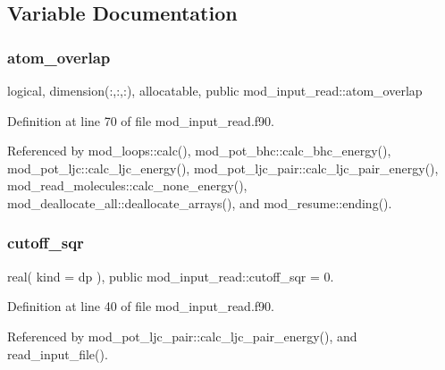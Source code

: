 \subsection{Variable Documentation}
\mbox{\label{namespacemod__input__read_ada662a2d234d567ce7da80355d2c9e21}} 
\subsubsection{\texorpdfstring{atom\+\_\+overlap}{atom\_overlap}}
{\footnotesize\ttfamily logical, dimension(\+:,\+:,\+:), allocatable, public mod\+\_\+input\+\_\+read\+::atom\+\_\+overlap}



Definition at line 70 of file mod\+\_\+input\+\_\+read.\+f90.



Referenced by mod\+\_\+loops\+::calc(), mod\+\_\+pot\+\_\+bhc\+::calc\+\_\+bhc\+\_\+energy(), mod\+\_\+pot\+\_\+ljc\+::calc\+\_\+ljc\+\_\+energy(), mod\+\_\+pot\+\_\+ljc\+\_\+pair\+::calc\+\_\+ljc\+\_\+pair\+\_\+energy(), mod\+\_\+read\+\_\+molecules\+::calc\+\_\+none\+\_\+energy(), mod\+\_\+deallocate\+\_\+all\+::deallocate\+\_\+arrays(), and mod\+\_\+resume\+::ending().

\mbox{\label{namespacemod__input__read_a9ef9305fdc4e5164af51f0da464c36c0}} 
\subsubsection{\texorpdfstring{cutoff\+\_\+sqr}{cutoff\_sqr}}
{\footnotesize\ttfamily real( kind = dp ), public mod\+\_\+input\+\_\+read\+::cutoff\+\_\+sqr = 0.}



Definition at line 40 of file mod\+\_\+input\+\_\+read.\+f90.



Referenced by mod\+\_\+pot\+\_\+ljc\+\_\+pair\+::calc\+\_\+ljc\+\_\+pair\+\_\+energy(), and read\+\_\+input\+\_\+file().

\mbox{\label{namespacemod__input__read_a76985d277087bc52f1b81814fe4c50bc}} 
